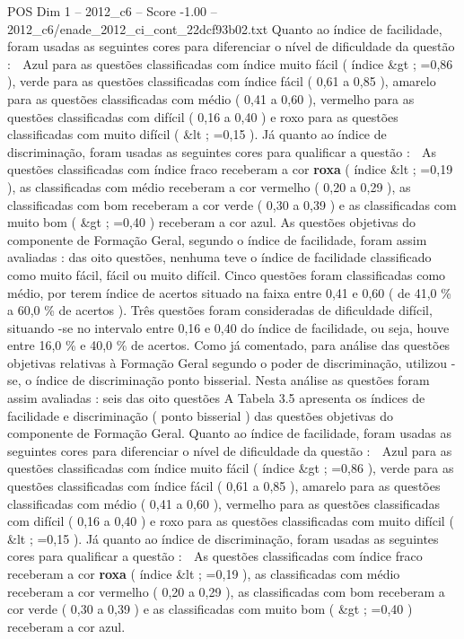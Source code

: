 \begin{textsample}{POS Dim 1 – 2012\_c6 – Score -1.00 – 2012\_c6/enade\_2012\_ci\_cont\_22dcf93b02.txt}
Quanto ao índice de facilidade, foram usadas as seguintes cores para diferenciar o nível de dificuldade da questão :  Azul para as questões classificadas com índice muito fácil ( índice \&gt ; =0,86 ), verde para as questões classificadas com índice fácil ( 0,61 a 0,85 ), amarelo para as questões classificadas com médio ( 0,41 a 0,60 ), vermelho para as questões classificadas com difícil ( 0,16 a 0,40 ) e roxo para as questões classificadas com muito difícil ( \&lt ; =0,15 ).
Já quanto ao índice de discriminação, foram usadas as seguintes cores para qualificar a questão :  As questões classificadas com índice fraco receberam a cor \textbf{roxa} ( índice \&lt ; =0,19 ), as classificadas com médio receberam a cor vermelho ( 0,20 a 0,29 ), as classificadas com bom receberam a cor verde ( 0,30 a 0,39 ) e as classificadas com muito bom ( \&gt ; =0,40 ) receberam a cor azul.
As questões objetivas do componente de Formação Geral, segundo o índice de facilidade, foram assim avaliadas : das oito questões, nenhuma teve o índice de facilidade classificado como muito fácil, fácil ou muito difícil.
Cinco questões foram classificadas como médio, por terem índice de acertos situado na faixa entre 0,41 e 0,60 ( de 41,0 \% a 60,0 \% de acertos ).
Três questões foram consideradas de dificuldade difícil, situando -se no intervalo entre 0,16 e 0,40 do índice de facilidade, ou seja, houve entre 16,0 \% e 40,0 \% de acertos.
Como já comentado, para análise das questões objetivas relativas à Formação Geral segundo o poder de discriminação, utilizou -se, o índice de discriminação ponto bisserial.
Nesta análise as questões foram assim avaliadas : seis das oito questões A Tabela 3.5 apresenta os índices de facilidade e discriminação ( ponto bisserial ) das questões objetivas do componente de Formação Geral.
Quanto ao índice de facilidade, foram usadas as seguintes cores para diferenciar o nível de dificuldade da questão :  Azul para as questões classificadas com índice muito fácil ( índice \&gt ; =0,86 ), verde para as questões classificadas com índice fácil ( 0,61 a 0,85 ), amarelo para as questões classificadas com médio ( 0,41 a 0,60 ), vermelho para as questões classificadas com difícil ( 0,16 a 0,40 ) e roxo para as questões classificadas com muito difícil ( \&lt ; =0,15 ).
Já quanto ao índice de discriminação, foram usadas as seguintes cores para qualificar a questão :  As questões classificadas com índice fraco receberam a cor \textbf{roxa} ( índice \&lt ; =0,19 ), as classificadas com médio receberam a cor vermelho ( 0,20 a 0,29 ), as classificadas com bom receberam a cor verde ( 0,30 a 0,39 ) e as classificadas com muito bom ( \&gt ; =0,40 ) receberam a cor azul.

\end{textsample}
